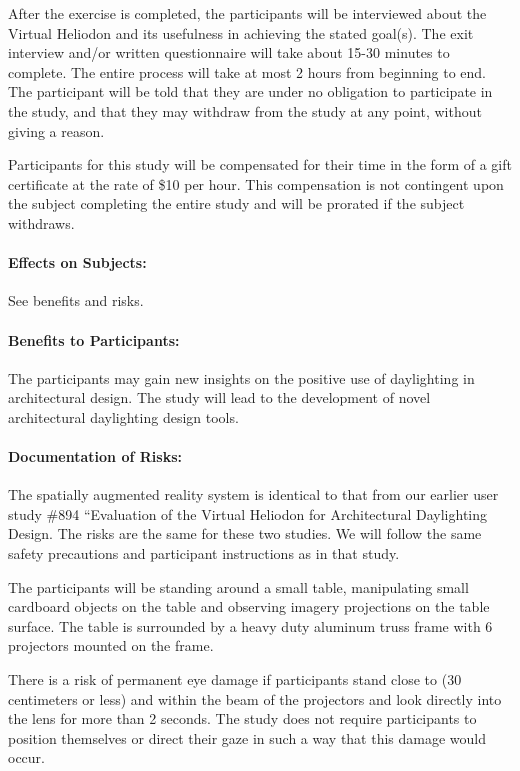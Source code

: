 \documentclass[10pt]{article}
\begin{document}
After the exercise is completed, the participants will be interviewed about
the Virtual Heliodon and its usefulness in achieving the stated goal(s). The exit interview and/or written
questionnaire will take about 15-30 minutes to complete. The entire process will take at most 2 hours from
beginning to end. The participant will be told that they are under no obligation to participate in the study,
and that they may withdraw from the study at any point, without giving a reason.

Participants for this study will be compensated for their time in the form of a gift certificate at the rate
of \$10 per hour. This compensation is not contingent upon the subject completing the entire study and will
be prorated if the subject withdraws.


\paragraph{Effects on Subjects:}
%
See benefits and risks.

\paragraph{Benefits to Participants:}
The participants may gain new insights on the positive use of daylighting in
architectural design. The study will lead to the development of novel architectural daylighting design
tools.


\paragraph{Documentation of Risks:}   
The spatially augmented reality system is identical to that from our
earlier user study \#894 “Evaluation of the Virtual Heliodon for
Architectural Daylighting Design.  The risks are the same for these
two studies.  We will follow the same safety precautions and
participant instructions as in that study.

The participants will be standing around a small table, manipulating
small cardboard objects on the table and observing imagery projections
on the table surface.  The table is surrounded by a heavy duty
aluminum truss frame with 6 projectors mounted on the frame.

There is a risk of permanent eye damage if participants stand close
to (30 centimeters or less) and within the beam of the projectors and
look directly into the lens for more than 2 seconds.  The study does
not require participants to position themselves or direct their gaze
in such a way that this damage would occur.
\end{document}
